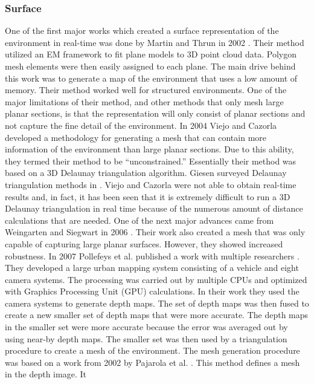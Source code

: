 \documentclass[12pt]{article}
\begin{document}
\subsubsection{Surface}

One of the first major works which created a surface representation of the
environment in real-time was done by Martin and Thrun in 2002
\cite{Martin2002}. Their method utilized an EM framework to fit plane
models to 3D point cloud data. Polygon mesh elements were then easily
assigned to each plane. The main drive behind this work was to generate a
map of the environment that uses a low amount of memory. Their  method
worked well for structured environments. One of the major limitations of
their method, and other methods that only mesh large planar sections, is
that the representation will only consist of planar sections and not
capture the fine detail of the environment. In 2004 Viejo and Cazorla
\cite{springerlink:10.1007/978-3-540-30463-0_30} developed a methodology
for generating a mesh that can contain more information of the environment
than large planar sections. Due to this ability, they termed their method
to be ``unconstrained.'' Essentially their method was based on a 3D
Delaunay triangulation algorithm. Giesen surveyed Delaunay triangulation
methods in \cite{Giesen2004}. Viejo and Cazorla were not able to obtain
real-time results and, in fact, it has been seen that it is extremely
difficult to run a 3D Delaunay triangulation in real time because of the
numerous amount of distance calculations that are needed.  One of the next
major advances came from Weingarten and Siegwart in 2006
\cite{Weingarten2006}. Their work also created a mesh that was only capable
of capturing large planar surfaces. However, they showed increased
robustness. In 2007 Pollefeys et al. published a work with multiple
researchers \cite{Akbarzadeh2006,Pollefeys2007}. They developed a large
urban mapping system consisting of a vehicle and eight camera systems. The
processing was carried out by multiple CPUs and optimized with Graphics
Processing Unit (GPU) calculations. In their work they used the camera
systems to generate depth maps. The set of depth maps was then fused to
create a new smaller set of depth maps that were more accurate. The depth
maps in the smaller set were more accurate because the error was averaged
out by using near-by depth maps. The smaller set was then used by a
triangulation procedure to create a mesh of the environment.  The mesh
generation procedure was based on a work from 2002 by Pajarola et al.
\cite{Pajarola2002}. This method defines a mesh in the depth image. It
\end{document}
